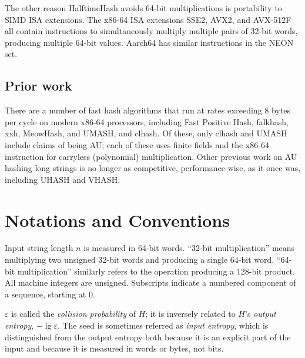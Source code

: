 \documentclass[runningheads]{llncs}
\begin{document}

The other reason HalftimeHash avoids 64-bit multiplications is portability to SIMD ISA extensions.
The x86-64 ISA extensions SSE2, AVX2, and AVX-512F all contain instructions to simultaneously multiply multiple pairs of 32-bit words, producing multiple 64-bit values.
Aarch64 has similar instructions in the NEON set.


\subsection{Prior work}

There are a number of fast hash algorithms that run at rates exceeding 8 bytes per cycle on modern x86-64 processors, including Fast Positive Hash, falk\-hash, xxh, Meow\-Hash, and UMASH, and cl\-hash. \cite{smhasher}
Of these, only cl\-hash and U\-MASH include claims of being AU; each of these uses finite fields and the x86-64 instruction for carryless (polynomial) multiplication.
Other previous work on AU hashing long strings is no longer as competitive, performance-wise, as it once was, including UHASH and VHASH. \cite{clhash,umac,vmac}



\section{Notations and Conventions}

Input string length $n$ is measured in 64-bit words.
``32-bit multiplication'' means multiplying two unsigned 32-bit words and producing a single 64-bit word.
``64-bit multiplication'' similarly refers to the operation producing a 128-bit product.
All machine integers are unsigned.
Subscripts indicate a numbered component of a sequence, starting at 0.

$\varepsilon$ is called the {\em collision probability} of $H$; it is inversely related to $H$'s {\em output entropy}, $-\lg \varepsilon$.
The seed is sometimes referred as {\em input entropy}, which is distinguished from the output entropy both because it is an explicit part of the input and because it is measured in words or bytes, not bits.
\end{document}
